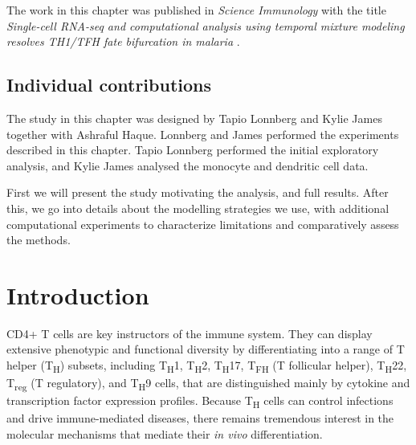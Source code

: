 The work in this chapter was published in \textit{Science Immunology} with the title \textit{Single-cell RNA-seq and computational analysis using temporal mixture modeling resolves TH1/TFH fate bifurcation in malaria} \cite{Lonnberg2017-cp}.

\subsection*{Individual contributions}

The study in this chapter was designed by Tapio Lonnberg and Kylie James together with Ashraful Haque. Lonnberg and James performed the experiments described in this chapter. Tapio Lonnberg performed the initial exploratory analysis, and Kylie James analysed the monocyte and dendritic cell data.

First we will present the study motivating the analysis, and full results. After this, we go into details about the modelling strategies we use, with additional computational experiments to characterize limitations and comparatively assess the methods.

\section{Introduction}

CD4+ T cells are key instructors of the immune system. They can display extensive phenotypic and functional diversity by differentiating into a range of T helper (T\textsubscript{H}) subsets, including T\textsubscript{H}1, T\textsubscript{H}2, T\textsubscript{H}17, T\textsubscript{FH} (T follicular helper), T\textsubscript{H}22, T\textsubscript{reg} (T regulatory), and T\textsubscript{H}9 cells, that are distinguished mainly by cytokine and transcription factor expression profiles. Because T\textsubscript{H} cells can control infections and drive immune-mediated diseases, there remains tremendous interest in the molecular mechanisms that mediate their \textit{in vivo} differentiation.

